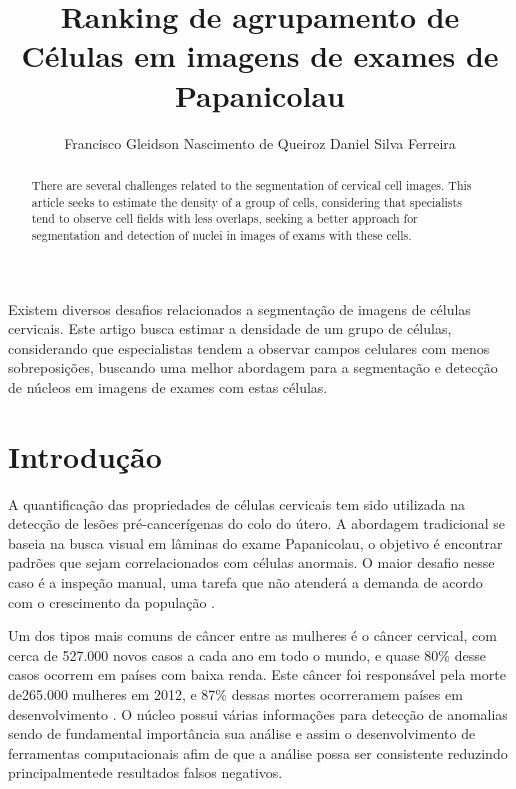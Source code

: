 \documentclass[12pt]{article}
\title{Ranking de agrupamento de Células em imagens de exames de Papanicolau}
\author{Francisco Gleidson Nascimento de Queiroz\inst{1} Daniel Silva Ferreira\inst{2} }
\begin{document}
 

\maketitle

\begin{abstract}
  There are several challenges related to the segmentation of cervical cell images. This article seeks to estimate the density of a group of cells, considering that specialists tend to observe cell fields with less overlaps, seeking a better approach for segmentation and detection of nuclei in images of exams with these cells.
\end{abstract}
     
\begin{resumo} 
  Existem diversos desafios relacionados a segmentação de imagens de células cervicais. Este artigo busca estimar a densidade de um grupo de células, considerando que especialistas tendem a observar campos celulares com menos sobreposições, buscando uma melhor abordagem para a segmentação e detecção de núcleos em imagens de exames com estas células.
\end{resumo}


\section{Introdução}

A quantiﬁcação das propriedades de células cervicais tem sido utilizada na detecção de lesões pré-cancerígenas do colo do útero. A abordagem tradicional se baseia na busca visual em lâminas do exame Papanicolau, o objetivo é encontrar padrões que sejam correlacionados com células anormais. O maior desaﬁo nesse caso é a inspeção manual, uma tarefa que não atenderá a demanda de acordo com o crescimento da população \cite{silva2018detecccao}.

Um dos tipos mais comuns de câncer entre as mulheres é o  câncer cervical, com cerca de 527.000 novos casos a cada ano  em todo o mundo, e quase 80\% desse casos ocorrem em países com baixa renda. Este câncer foi responsável pela morte de265.000 mulheres em 2012, e 87\% dessas mortes ocorreramem países em desenvolvimento \cite{ramalho2015cell}. O núcleo possui várias informações para detecção de anomalias sendo de fundamental importância sua análise e assim o desenvolvimento de ferramentas computacionais  afim de que a análise possa ser consistente reduzindo principalmentede resultados falsos negativos.
\end{document}
